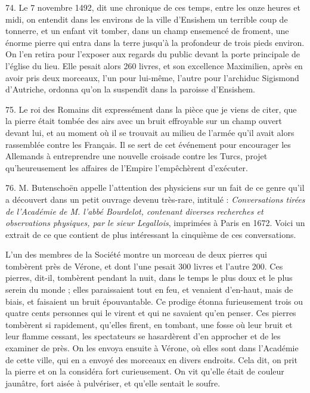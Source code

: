 \documentclass[a4paper, 11pt, oneside, polutonikogreek, french]{article}
\begin{document}
74. \og Le 7 novembre 1492, dit une chronique de ces temps, entre les onze heures et midi, on entendit dans les environs de la ville d'Ensishem un terrible coup de tonnerre, et un enfant vit tomber, dans un champ ensemencé de froment, une énorme pierre qui entra dans la terre jusqu'à la profondeur de trois pieds environ. On l'en retira pour l'exposer aux regards du public devant la porte principale de l'église du lieu. Elle pesait alors 260 livres, et son excellence Maximilien, après en avoir pris deux morceaux, l'un pour lui-même, l'autre pour l'archiduc Sigismond d'Autriche, ordonna qu'on la suspendît dans la paroisse d'Ensishem. \fg

75. \og Le roi des Romains dit expressément dans la pièce que je viens de citer, que la pierre était tombée des airs avec un bruit effroyable sur un champ ouvert devant lui, et au moment où il se trouvait au milieu de l'armée qu'il avait alors rassemblée contre les Français. Il se sert de cet événement pour encourager les Allemands à entreprendre une nouvelle croisade contre les Turcs, projet qu'heureusement les affaires de l'Empire l'empêchèrent d'exécuter. \fg

76. M. Butenschoën appelle l'attention des physiciens sur un fait de ce genre qu'il a découvert dans un petit ouvrage devenu très-rare, intitulé : \emph{Conversations tirées de l'Académie de M. l'abbé Bourdelot, contenant diverses recherches et observations physiques, par le sieur Legallois}, imprimées à Paris en 1672. Voici un extrait de ce que contient de plus intéressant la cinquième de ces conversations.

\og L'un des membres de la Société montre un morceau de deux pierres qui tombèrent près de Vérone, et dont l'une pesait 300 livres et l'autre 200. \og Ces pierres, dit-il, tombèrent pendant la nuit, dans le temps le plus doux et le plus serein du monde ; elles paraissaient tout en feu, et venaient d'en-haut, mais de biais, et faisaient un bruit épouvantable. Ce prodige étonna furieusement trois ou quatre cents personnes qui le virent et qui ne savaient qu'en penser. Ces pierres tombèrent si rapidement, qu'elles firent, en tombant, une fosse où leur bruit et leur flamme cessant, les spectateurs se hasardèrent d'en approcher et de les examiner de près. On les envoya ensuite à Vérone, où elles sont dans l'Académie de cette ville, qui en a envoyé des morceaux en divers endroits. \fg Cela dit, on prit la pierre et on la considéra fort curieusement. \og On vit qu'elle était de couleur jaunâtre, fort aisée à pulvériser, et qu'elle sentait le soufre. \fg \fg
\end{document}
